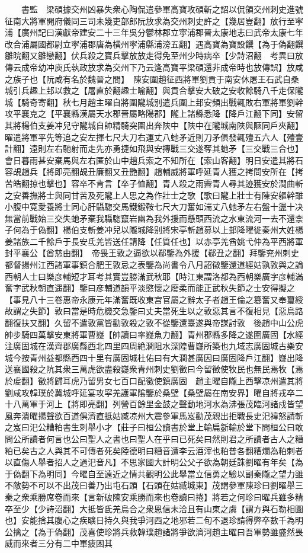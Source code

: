 　　書監　梁碩據交州凶暴失衆心陶侃遣參軍高寶攻碩斬之詔以侃領交州刺史進號征南大將軍開府儀同三司未幾吏部郎阮放求為交州刺史許之【幾居豈翻】放行至寜浦【廣州記曰漢獻帝建安二十三年吳分鬱林郡立寜浦郡晉太康地志曰武帝太康七年改合浦屬國都尉立寜浦郡唐為横州寜浦縣浦滂五翻】遇高寶為寶設饌【為于偽翻饌雛晥翻又雛戀翻】伏兵殺之寶兵擊放放走得免至州少時病卒【少詩沼翻　考異曰放傳云成帝幼冲庾氏執政放求為交州下乃云逢高寶平梁碩還非成帝時也放傳誤】放咸之族子也【阮咸有名於魏晉之間】　陳安圍趙征西將軍劉貢于南安休屠王石武自桑城引兵趣上邽以救之【屠直於翻趣士喻翻】與貢合擊安大破之安收餘騎八千走保隴城【騎奇寄翻】秋七月趙主曜自將圍隴城别遣兵圍上邽安頻出戰輒敗右軍將軍劉幹攻平襄克之【平襄縣漢屬天水郡晉屬略陽郡】隴上諸縣悉降【降戶江翻下同】安留其將楊伯支姜冲兒守隴城自帥精騎突圍出奔陜中【陜中在隴城南陜與陿同戶夾翻】曜遣將軍平先等追之安左揮七尺大刀右運丈八虵矛近則刀矛俱發輒殪五六人【殪壹計翻】遠則左右馳射而走先亦勇捷如飛與安摶戰三交遂奪其虵矛【三交戰三合也】會日暮雨甚安棄馬與左右匿於山中趙兵索之不知所在【索山客翻】明日安遣其將石容覘趙兵【將即亮翻覘丑廉翻又丑艷翻】趙輔威將軍呼延青人獲之拷問安所在【拷苦皓翻掠也擊也】容卒不肯言【卒子恤翻】青人殺之雨霽青人尋其迹獲安於澗曲斬之安善撫將士與同甘苦及死隴上人思之為作壯士之歌【歌曰隴上壯士有陳安軀幹雖小腹中寛愛養將士同心肝䯀騘交馬鐵鍛鞍七尺大刀奮如湍丈八虵矛左右盤十盪十决無當前戰始三交失虵矛棄我䯀騘竄岩幽為我外援而懸頭西流之水東流河一去不還柰子何為于偽翻】楊伯支斬姜冲兒以隴城降别將宋亭斬趙募以上邽降曜徙秦州大姓楊姜諸族二千餘戶于長安氐羌皆送任請降【任質任也】以赤亭羌酋姚弋仲為平西將軍封平襄公【酋慈由翻】　帝畏王敦之逼欲以郗鑒為外援【郗丑之翻】拜鑒兖州刺史都督揚州江西諸軍事鎮合肥王敦忌之表鑒為尚書令八月詔徵鑒還道經姑孰敦與之論西朝人士曰樂彦輔短才耳考其實豈勝滿武秋耶【時江東謂洛都為西朝樂廣字彦輔滿奮字武秋朝直遥翻】鑒曰彦輔道韻平淡愍懷之廢柔而能正武秋失節之士安得擬之【事見八十三卷惠帝永康元年滿奮既收東宫官屬之辭太子者趙王倫之簒奮又奉璽綬故謂之失節】敦曰當是時危機交急鑒曰丈夫當死生以之敦惡其言不復相見【惡烏路翻復扶又翻】久留不遣敦黨皆勸敦殺之敦不從鑒還臺遂與帝謀討敦　後趙中山公虎帥步騎四萬擊安東將軍曹嶷【帥讀曰率嶷魚力翻】青州郡縣多降之遂圍廣固【水經注廣固城在漢齊郡廣縣西北四里四周絶澗阻水深隍曹嶷所築也九域志廣固城古樂安城今按青州益都縣西四十里有廣固城杜佑曰有大澗甚廣因曰廣固降戶江翻】嶷出降送襄國殺之阬其衆三萬虎欲盡殺嶷衆青州刺史劉徵曰今留徵使牧民也無民焉牧【焉於䖍翻】徵將歸耳虎乃留男女七百口配徵使鎮廣固　趙主曜自隴上西擊凉州遣其將劉咸攻韓璞於冀城呼延宴攻寜羌護軍隂鑒於桑壁【桑壁屬在南安界】曜自將戎卒二十八萬軍于河上【將即亮翻】列營百餘里金鼓之聲動地河水為沸張茂臨河諸戍皆望風奔潰曜揚聲欲百道俱濟直抵姑臧凉州大震參軍馬岌勸茂親出拒戰長史汜褘怒請斬之岌曰汜公糟粕書生刺舉小才【莊子曰桓公讀書於堂上輪扁斵輪於堂下問桓公曰敢問公所讀者何言也公曰聖人之書也曰聖人在乎曰已死矣曰然則君之所讀者古人之糟粕已矣古之人與其不可傳者死矣陸德明曰糟音遭李云酒滓也粕普各翻糟爛為粕刺者以直傷人舉者招人之過汜音凡】不思家國大計明公父子欲為朝廷誅劉曜有年矣【為于偽翻下為明同】今曜自至遠近之情共觀明公此舉當立信勇之驗以副秦隴之望力雖不敵勢不可以不出茂曰善乃出屯石頭【石頭在姑臧城東】茂謂參軍陳珍曰劉曜舉三秦之衆乘勝席卷而來【言新破陳安乘勝而來也卷讀曰捲】將若之何珍曰曜兵雖多精卒至少【少詩沼翻】大抵皆氐羌烏合之衆恩信未洽且有山東之虞【謂方與石勒相圖也】安能捨其腹心之疾曠日持久與我爭河西之地邪若二旬不退珍請得弊卒數千為明公擒之【為于偽翻】茂喜使珍將兵救韓璞趙諸將爭欲濟河趙主曜曰吾軍勢雖盛然畏威而來者三分有二中軍疲困其